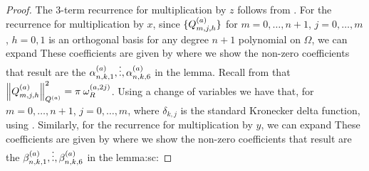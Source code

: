 \begin{proof}
	The 3-term recurrence for multiplication by $z$ follows from . For the recurrence for multiplication by $x$, since $\{Q_{m,j,h}^{(a)}\}$ for $m = 0,\dots,n+1$, $j = 0,\dots,m$, $h = 0,1$ is an orthogonal basis for any degree $n+1$ polynomial on $\Omega$, we can expand 
These coefficients are given by
where we show the non-zero coefficients that result are the $\alpha^{(a)}_{n,k,1},\vdots,\alpha^{(a)}_{n,k,6}$ in the lemma.
Recall from  that $\left\| Q_{m,j,h}^{(a)} \right\|_{Q^{(a)}}^2 = \pi \: \omega_R^{(a,2j)}$. Using a change of variables 
we have that, for $m = 0,\dots,n+1$, $j = 0,\dots,m$, 
where $\delta_{k, j}$ is the standard Kronecker delta function, using . Similarly, for the recurrence for multiplication by $y$, we can expand 
These coefficients are given by
where we show the non-zero coefficients that result are the $\beta^{(a)}_{n,k,1},\vdots,\beta^{(a)}_{n,k,6}$ in the lemma:sc:
\end{proof}
